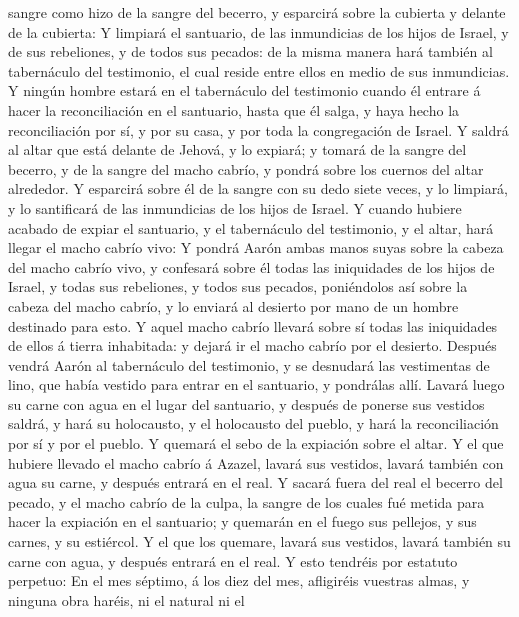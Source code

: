sangre como hizo de la sangre del becerro, y esparcirá sobre la cubierta
y delante de la cubierta:  Y limpiará el santuario, de las
inmundicias de los hijos de Israel, y de sus rebeliones, y de todos sus
pecados: de la misma manera hará también al tabernáculo del testimonio,
el cual reside entre ellos en medio de sus inmundicias.  Y
ningún hombre estará en el tabernáculo del testimonio cuando él entrare
á hacer la reconciliación en el santuario, hasta que él salga, y haya
hecho la reconciliación por sí, y por su casa, y por toda la
congregación de Israel.  Y saldrá al altar que está delante
de Jehová, y lo expiará; y tomará de la sangre del becerro, y de la
sangre del macho cabrío, y pondrá sobre los cuernos del altar alrededor.
 Y esparcirá sobre él de la sangre con su dedo siete veces,
y lo limpiará, y lo santificará de las inmundicias de los hijos de
Israel.  Y cuando hubiere acabado de expiar el santuario, y
el tabernáculo del testimonio, y el altar, hará llegar el macho cabrío
vivo:  Y pondrá Aarón ambas manos suyas sobre la cabeza del
macho cabrío vivo, y confesará sobre él todas las iniquidades de los
hijos de Israel, y todas sus rebeliones, y todos sus pecados,
poniéndolos así sobre la cabeza del macho cabrío, y lo enviará al
desierto por mano de un hombre destinado para esto.  Y
aquel macho cabrío llevará sobre sí todas las iniquidades de ellos á
tierra inhabitada: y dejará ir el macho cabrío por el desierto.
 Después vendrá Aarón al tabernáculo del testimonio, y se
desnudará las vestimentas de lino, que había vestido para entrar en el
santuario, y pondrálas allí.  Lavará luego su carne con
agua en el lugar del santuario, y después de ponerse sus vestidos
saldrá, y hará su holocausto, y el holocausto del pueblo, y hará la
reconciliación por sí y por el pueblo.  Y quemará el sebo
de la expiación sobre el altar.  Y el que hubiere llevado
el macho cabrío á Azazel, lavará sus vestidos, lavará también con agua
su carne, y después entrará en el real.  Y sacará fuera del
real el becerro del pecado, y el macho cabrío de la culpa, la sangre de
los cuales fué metida para hacer la expiación en el santuario; y
quemarán en el fuego sus pellejos, y sus carnes, y su estiércol.
 Y el que los quemare, lavará sus vestidos, lavará también
su carne con agua, y después entrará en el real.  Y esto
tendréis por estatuto perpetuo: En el mes séptimo, á los diez del mes,
afligiréis vuestras almas, y ninguna obra haréis, ni el natural ni el
